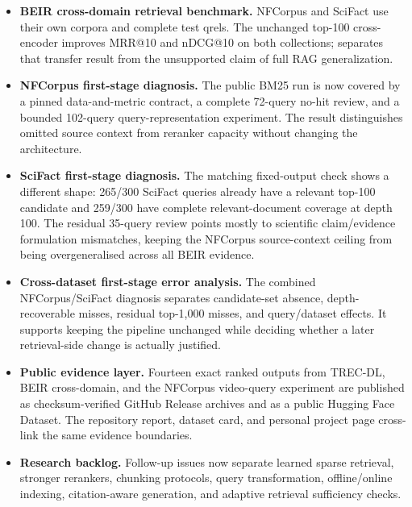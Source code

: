\documentclass[11pt,a4paper]{article}
\makeatletter
\newcommand{\mrr}{MRR@10}
\newcommand{\ndcg}{nDCG@10}
\newcommand{\bmtwofive}{BM25}
\makeatother
\begin{document}
\begin{itemize}
         reports both tracks separately with query-level lift and
         failure analysis.
  \item \textbf{BEIR cross-domain retrieval benchmark.}  NFCorpus and
        SciFact use their own corpora and complete test qrels.  The
        unchanged top-100 cross-encoder improves \mrr{} and \ndcg{} on
        both collections;  separates that
        transfer result from the unsupported claim of full RAG
        generalization.
  \item \textbf{NFCorpus first-stage diagnosis.}  The public
        \bmtwofive{} run is now covered by a pinned data-and-metric
        contract, a complete 72-query no-hit review, and a bounded
        102-query query-representation experiment.  The result
        distinguishes omitted source context from reranker capacity
        without changing the architecture.
  \item \textbf{SciFact first-stage diagnosis.}  The matching
        fixed-output check shows a different shape: 265/300 SciFact
        queries already have a relevant top-100 candidate and 259/300
        have complete relevant-document coverage at depth 100.  The
        residual 35-query review points mostly to scientific
        claim/evidence formulation mismatches, keeping the NFCorpus
        source-context ceiling from being overgeneralised across all
        BEIR evidence.
  \item \textbf{Cross-dataset first-stage error analysis.}  The
        combined NFCorpus/SciFact diagnosis separates candidate-set
        absence, depth-recoverable misses, residual top-1,000 misses,
        and query/dataset effects.  It supports keeping the pipeline
        unchanged while deciding whether a later retrieval-side change
        is actually justified.
  \item \textbf{Public evidence layer.}  Fourteen exact ranked outputs
        from TREC-DL, BEIR cross-domain, and the NFCorpus video-query
        experiment are published as checksum-verified GitHub Release
        archives and as a public Hugging Face Dataset.  The repository
        report, dataset card, and personal project page cross-link the
        same evidence boundaries.
  \item \textbf{Research backlog.}  Follow-up issues now separate
        learned sparse retrieval, stronger rerankers, chunking
        protocols, query transformation, offline/online indexing,
        citation-aware generation, and adaptive
        retrieval sufficiency checks.
\end{itemize}
\end{document}
